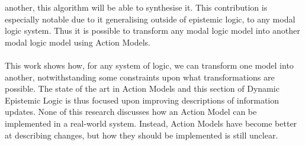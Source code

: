 \documentclass[12pt, a4paper, twoside]{article}
\begin{document}
another, this algorithm will be able to synthesise it.
This contribution is especially notable due to it generalising outside of
epistemic logic, to any modal logic system.
Thus it is possible to transform any modal logic model into another modal logic
model using Action Models.\citep{hales13synthesis}\\
\\
This work shows how, for any system of logic, we can transform one model into
another, notwithstanding some constraints upon what transformations are
possible.
The state of the art in Action Models and this section of Dynamic Epistemic
Logic is thus focused upon improving descriptions of information updates.
None of this research discusses how an Action Model can be implemented in a
real-world system.
Instead, Action Models have become better at describing changes, but how they
should be implemented is still unclear.
\end{document}
